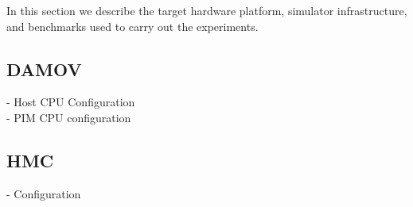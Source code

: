 
In this section we describe the target hardware platform, simulator infrastructure, and benchmarks used to carry out the experiments.

\subsection{DAMOV}
- Host CPU Configuration \\
- PIM CPU configuration \\
\subsection{HMC}
- Configuration \\


%    
%
%
%
%
%
%
